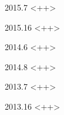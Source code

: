 \documentclass[12pt]{article}
\begin{document}
\begin{solution}{2015.7}
<++>
\end{solution}


\begin{solution}{2015.16}
<++>
\end{solution}


\begin{solution}{2014.6}
<++>
\end{solution}


\begin{solution}{2014.8}
<++>
\end{solution}


\begin{solution}{2013.7}
<++>
\end{solution}


\begin{solution}{2013.16}
<++>
\end{solution}
\end{document}
